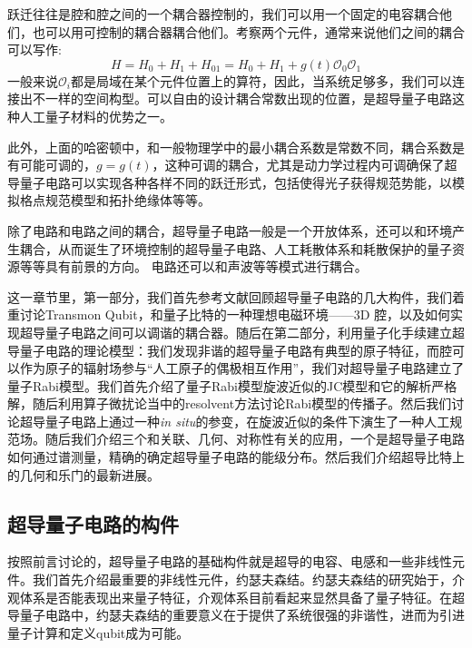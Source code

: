 \documentclass[supercite]{HustGraduPaper}
\begin{document}
   跃迁往往是腔和腔之间的一个耦合器控制的，我们可以用一个固定的电容耦合他们，也可以用可控制的耦合器耦合他们。考察两个元件，通常来说他们之间的耦合可以写作:
   \begin{equation}
   	H = H_0 + H_1 + H_{01} = H_0 + H_1 + g(t)\mathcal{O}_0 \mathcal{O}_1
   \end{equation}
   一般来说$\mathcal{O}_i$都是局域在某个元件位置上的算符，因此，当系统足够多，我们可以连接出不一样的空间构型。可以自由的设计耦合常数出现的位置，是超导量子电路这种人工量子材料的优势之一。
   
   此外，上面的哈密顿中，和一般物理学中的最小耦合系数是常数不同，耦合系数是有可能可调的，$g = g(t)$，这种可调的耦合，尤其是动力学过程内可调确保了超导量子电路可以实现各种各样不同的跃迁形式，包括使得光子获得规范势能，以模拟格点规范模型和拓扑绝缘体等等。
   
   除了电路和电路之间的耦合，超导量子电路一般是一个开放体系，还可以和环境产生耦合，从而诞生了环境控制的超导量子电路、人工耗散体系和耗散保护的量子资源等等具有前景的方向。 电路还可以和声波等等模式进行耦合。
   
   这一章节里，第一部分，我们首先参考文献\cite{GU20171}回顾超导量子电路的几大构件，我们着重讨论Transmon Qubit，和量子比特的一种理想电磁环境——3D 腔\cite{reagor2016quantum}，以及如何实现超导量子电路之间可以调谐的耦合器。随后在第二部分，利用量子化手续建立超导量子电路的理论模型：我们发现非谐的超导量子电路有典型的原子特征，而腔可以作为原子的辐射场参与“人工原子的偶极相互作用”，我们对超导量子电路建立了量子Rabi模型。我们首先介绍了量子Rabi模型旋波近似的JC模型和它的解析严格解，随后利用算子微扰论当中的resolvent方法讨论Rabi模型的传播子。然后我们讨论超导量子电路上通过一种\textit{in situ}的参变，在旋波近似的条件下演生了一种人工规范场。随后我们介绍三个和关联、几何、对称性有关的应用，一个是超导量子电路如何通过谱测量，精确的确定超导量子电路的能级分布。然后我们介绍超导比特上的几何和乐门的最新进展。
   
   \subsection{超导量子电路的构件\label{sec:fab}}
   	按照前言讨论的，超导量子电路的基础构件就是超导的电容、电感和一些非线性元件。我们首先介绍最重要的非线性元件，约瑟夫森结。约瑟夫森结的研究始于，介观体系是否能表现出来量子特征，介观体系目前看起来显然具备了量子特征。在超导量子电路中，约瑟夫森结的重要意义在于提供了系统很强的非谐性，进而为引进量子计算和定义qubit成为可能。\cite{nakamura1999coherent}
   
\end{document}
